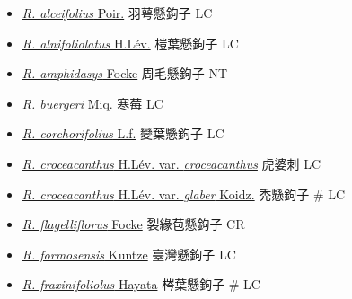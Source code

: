 \begin{itemize}
  \begin{itemize}
        \item[] \href{http://www.theplantlist.org/tpl1.1/search?q=Rubus+alceifolius}{\textit{R. alceifolius} Poir.}   羽萼懸鉤子   LC
        \item[] \href{http://www.theplantlist.org/tpl1.1/search?q=Rubus+alnifoliolatus}{\textit{R. alnifoliolatus} H.Lév.}   榿葉懸鉤子   LC
        \item[] \href{http://www.theplantlist.org/tpl1.1/search?q=Rubus+amphidasys}{\textit{R. amphidasys} Focke}   周毛懸鉤子   NT
        \item[] \href{http://www.theplantlist.org/tpl1.1/search?q=Rubus+buergeri}{\textit{R. buergeri} Miq.}   寒莓   LC
        \item[] \href{http://www.theplantlist.org/tpl1.1/search?q=Rubus+corchorifolius}{\textit{R. corchorifolius} L.f.}   變葉懸鉤子   LC
        \item[] \href{http://www.theplantlist.org/tpl1.1/search?q=Rubus+croceacanthus+var.+croceacanthus}{\textit{R. croceacanthus} H.Lév. var. \textit{croceacanthus}}   虎婆刺   LC
        \item[] \href{http://www.theplantlist.org/tpl1.1/search?q=Rubus+croceacanthus+var.+glaber}{\textit{R. croceacanthus} H.Lév. var. \textit{glaber} Koidz.}   禿懸鉤子  \# LC
        \item[] \href{http://www.theplantlist.org/tpl1.1/search?q=Rubus+flagelliflorus}{\textit{R. flagelliflorus} Focke}   裂緣苞懸鉤子   CR
        \item[] \href{http://www.theplantlist.org/tpl1.1/search?q=Rubus+formosensis}{\textit{R. formosensis} Kuntze}   臺灣懸鉤子   LC
        \item[] \href{http://www.theplantlist.org/tpl1.1/search?q=Rubus+fraxinifoliolus}{\textit{R. fraxinifoliolus} Hayata}   梣葉懸鉤子  \# LC

\end{itemize}
\end{itemize}
